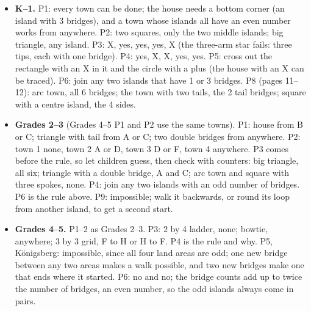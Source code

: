 \documentclass[10pt]{article}
\newcommand{\sect}[1]{\par\medskip{\large\bfseries #1}\par\smallskip}
\begin{document}
\sect{Key answers}
\begin{itemize}
\item \textbf{K--1.} P1: every town can be done; the house needs a bottom corner (an island with 3 bridges), and a town whose islands all have an even number works from anywhere. P2: two squares, only the two middle islands; big triangle, any island. P3: X, yes, yes, yes, X (the three-arm star fails: three tips, each with one bridge). P4: yes, X, X, yes, yes. P5: cross out the rectangle with an X in it and the circle with a plus (the house with an X can be traced). P6: join any two islands that have 1 or 3 bridges. P8 (pages 11--12): arc town, all 6 bridges; the town with two tails, the 2 tail bridges; square with a centre island, the 4 sides.
\item \textbf{Grades 2--3} (Grades 4--5 P1 and P2 use the same towns). P1: house from B or C; triangle with tail from A or C; two double bridges from anywhere. P2: town 1 none, town 2 A or D, town 3 D or F, town 4 anywhere. P3 comes before the rule, so let children guess, then check with counters: big triangle, all six; triangle with a double bridge, A and C; arc town and square with three spokes, none. P4: join any two islands with an odd number of bridges. P6 is the rule above. P9: impossible; walk it backwards, or round its loop from another island, to get a second start.
\item \textbf{Grades 4--5.} P1--2 as Grades 2--3. P3: 2 by 4 ladder, none; bowtie, anywhere; 3 by 3 grid, F to H or H to F. P4 is the rule and why. P5, K\"onigsberg: impossible, since all four land areas are odd; one new bridge between any two areas makes a walk possible, and two new bridges make one that ends where it started. P6: no and no; the bridge counts add up to twice the number of bridges, an even number, so the odd islands always come in pairs.
\end{itemize}
\end{document}
